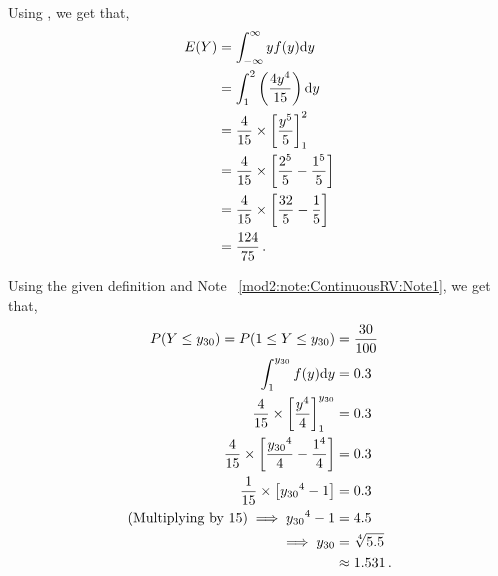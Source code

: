 \begin{subquestions}
\begin{subsubquestions}
\subquestion

Using , we get that,
\begin{align}
	E(Y) & = \int_{-\infty}^{\infty}y f(y)\mathrm{d}y \nonumber \\
	     & = \int_{1}^{2} \left( \frac{4y^4}{15}\right)\mathrm{d}y \nonumber \\
	     & = \frac{4}{15} \times \left[\frac{y^5}{5} \right]^2_1 \nonumber \\
	     & = \frac{4}{15} \times \left[\frac{2^5}{5} -\frac{1^5}{5} \right] \nonumber \\
	     & = \frac{4}{15} \times \left[\frac{32}{5} -\frac{1}{5} \right] \nonumber \\
	     & = \frac{124}{75} \,. 
\end{align}


\subquestion

Using the given definition and Note ~\ref{mod2:note:ContinuousRV:Note1}, we get that,
\begin{align}
	P(Y \leq y_{30}) = P(1 \leq Y \leq y_{30}) & = \frac{30}{100} \nonumber \\
	                   \int_{1}^{y_{30}} f(y)\mathrm{d}y & = 0.3 \nonumber \\
	                   \frac{4}{15} \times \left[\frac{y^4}{4}\right]^{{y_{30}}}_1 & = 0.3 \nonumber \\
	                   \frac{4}{15} \times \left[\frac{{y_{30}}^4}{4} - \frac{1^4}{4}\right] & = 0.3 \nonumber \\
	                   \frac{1}{15} \times \left[{y_{30}}^4 - 1\right] & = 0.3 \nonumber \\                   
	     \text{(Multiplying by 15)} \implies {y_{30}}^4 -1 & = 4.5 \nonumber \\
	                   \implies {y_{30}} & = \sqrt[4]{5.5} \nonumber \\
	                                     & \approx 1.531 \,.             
\end{align}

\end{subsubquestions}
	
\end{subquestions}


